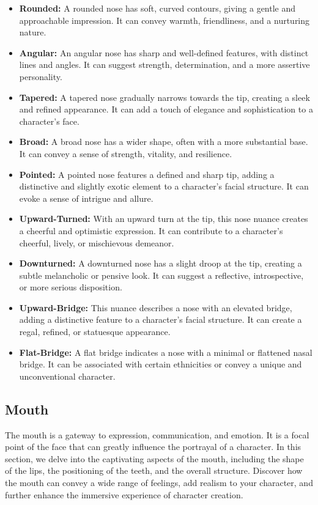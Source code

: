 \documentclass[12pt]{book}  %
\begin{document}
\begin{itemize}
    \item \textbf{Rounded:} A rounded nose has soft, curved contours, giving a gentle and approachable impression. It can convey warmth, friendliness, and a nurturing nature.
    \item \textbf{Angular:} An angular nose has sharp and well-defined features, with distinct lines and angles. It can suggest strength, determination, and a more assertive personality.
    \item \textbf{Tapered:} A tapered nose gradually narrows towards the tip, creating a sleek and refined appearance. It can add a touch of elegance and sophistication to a character's face.
    \item \textbf{Broad:} A broad nose has a wider shape, often with a more substantial base. It can convey a sense of strength, vitality, and resilience.
    \item \textbf{Pointed:} A pointed nose features a defined and sharp tip, adding a distinctive and slightly exotic element to a character's facial structure. It can evoke a sense of intrigue and allure.
    \item \textbf{Upward-Turned:} With an upward turn at the tip, this nose nuance creates a cheerful and optimistic expression. It can contribute to a character's cheerful, lively, or mischievous demeanor.
    \item \textbf{Downturned:} A downturned nose has a slight droop at the tip, creating a subtle melancholic or pensive look. It can suggest a reflective, introspective, or more serious disposition.
    \item \textbf{Upward-Bridge:} This nuance describes a nose with an elevated bridge, adding a distinctive feature to a character's facial structure. It can create a regal, refined, or statuesque appearance.
    \item \textbf{Flat-Bridge:} A flat bridge indicates a nose with a minimal or flattened nasal bridge. It can be associated with certain ethnicities or convey a unique and unconventional character.
\end{itemize}

\subsection{\textbf{Mouth}}

The mouth is a gateway to expression, communication, and emotion. It is a focal point of the face that can greatly influence the portrayal of a character. In this section, we delve into the captivating aspects of the mouth, including the shape of the lips, the positioning of the teeth, and the overall structure. Discover how the mouth can convey a wide range of feelings, add realism to your character, and further enhance the immersive experience of character creation.
\end{document}
